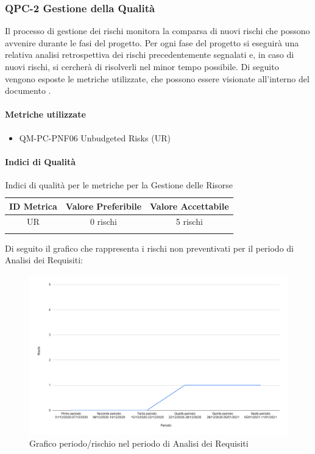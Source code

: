 			
			
			
			
			
			
			
			
	
	
	
	
	
	
	
	\subsubsection{QPC-2 Gestione della Qualità}

		Il processo di gestione dei rischi monitora la comparsa di nuovi rischi che possono avvenire durante le fasi del progetto.
		Per ogni fase del progetto si eseguirà una relativa analisi retrospettiva dei rischi precedentemente segnalati e, in caso di nuovi rischi, si cercherà di risolverli nel minor tempo possibile.
		Di seguito vengono esposte le metriche utilizzate, che possono essere visionate all'interno del documento .

		\paragraph{Metriche utilizzate}
			\begin{itemize}
				\item QM-PC-PNF06 Unbudgeted Risks (UR)
			\end{itemize}
			
		\paragraph{Indici di Qualità}
			\begin{center}
				\begin{longtable}{|c|c|c|}
				\hline
				\rowcolor{lighter-grayer}
				\textbf{ID Metrica} & \textbf{Valore Preferibile} & \textbf{Valore Accettabile}\\
				\hline
				\endfirsthead
				\hline
				UR & 0 rischi & 5 rischi \\
				\hline
				\caption{Indici di qualità per le metriche per la Gestione delle Risorse}
				\end{longtable}
			\end{center}

			
			Di seguito il grafico che rappresenta i rischi non preventivati per il periodo di Analisi dei Requisiti:
			
			\begin{figure}[H]
				\centering
				\includegraphics[width=0.9\linewidth]{./res/images/rischi.png}
				\caption{Grafico periodo/rischio nel periodo di Analisi dei Requisiti}
				\label{fig:Grafico rischi periodo di Analisi dei Requisiti}
			\end{figure}


